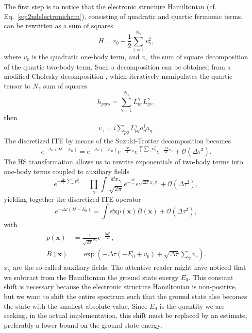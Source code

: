 \documentclass[../main.tex]{subfiles}
\begin{document}
The first step is to notice that the electronic structure Hamiltonian (cf. Eq.~\ref{eq:2ndelectronicham}), consisting of quadratic and quartic fermionic terms, can be rewritten as a sum of squares
\begin{equation}
    H = v_0 - \frac{1}{2} \sum_{\gamma = 1}^{N_\gamma} v_\gamma^2, 
\end{equation}
where $v_0$  is the quadratic one-body term, and  $v_\gamma$ the sum of square decomposition of the quartic two-body term. Such a decomposition can be obtained from a modified Cholesky decomposition \cite{motta2018abinitio}, which iteratively manipulates the quartic tensor to $N_\gamma$ sum of squares
\begin{equation}
    h_{pqrs} = \sum_{\gamma = 1}^{N_\gamma} L^\gamma_{pr} L^\gamma_{qs},
\end{equation} then
\begin{align}
    v_\gamma = i \sum_{pq} L^\gamma_{pq} a^\dagger_{p} a_{q}.
\end{align}
The discretized ITE by means of the Suzuki-Trotter decomposition becomes \cite{motta2018ab}
\begin{equation}
    e^{-\Delta \tau (H-E_0)} = e^{-\Delta \tau (-E_0)} e^{-\frac{\Delta \tau}{2}v_0} e^{\frac{\Delta \tau}{2}\sum_\gamma v_\gamma^2} e^{-\frac{\Delta \tau}{2}v_0} + \mathcal{O}(\Delta\tau^3).
\end{equation}
The \ac{HS} transformation allows us to rewrite exponentials of two-body terms into one-body terms coupled to auxiliary fields \cite{motta2018ab}
\begin{equation}
    e^{-\frac{\Delta \tau}{2}\sum_\gamma v_\gamma^2} = \prod_\gamma \int \frac{\dd x_\gamma}{\sqrt{2 \pi}}  e^{- \frac{x_\gamma^2}{2}} e^{\sqrt{\Delta \tau} x_\gamma v_\gamma} + \mathcal{O}(\Delta \tau^2),
\end{equation} yielding together the discretized ITE operator
\begin{equation}\label{eq:HSITE}
    e^{-\Delta \tau (H-E_0)} = \int \dd \bm{x} p(\bm{x}) B(\bm{x}) + \mathcal{O} (\Delta \tau^2),
\end{equation} with
\begin{align}
    p(\bm{x}) &= \frac{1}{\sqrt{2 \pi}^{N_\gamma}} e^{- \frac{|\bm{x}|^2}{2}}, \\
    B(\bm{x}) &= \exp(-\Delta \tau (-E_0 + v_0) + \sqrt{\Delta \tau} \sum_\gamma v_\gamma ).
\end{align}
$x_\gamma$ are the so-called auxiliary fields. The attentive reader might have noticed that we subtract from the Hamiltonian the ground state energy $E_0$. This constant shift is necessary because the electronic structure Hamiltonian is non-positive, but we want to shift the entire spectrum such that the ground state also becomes the state with the smallest absolute value. Since $E_0$ is the quantity we are seeking, in the actual implementation, this shift must be replaced by an estimate, preferably a lower bound on the ground state energy.
\end{document}
